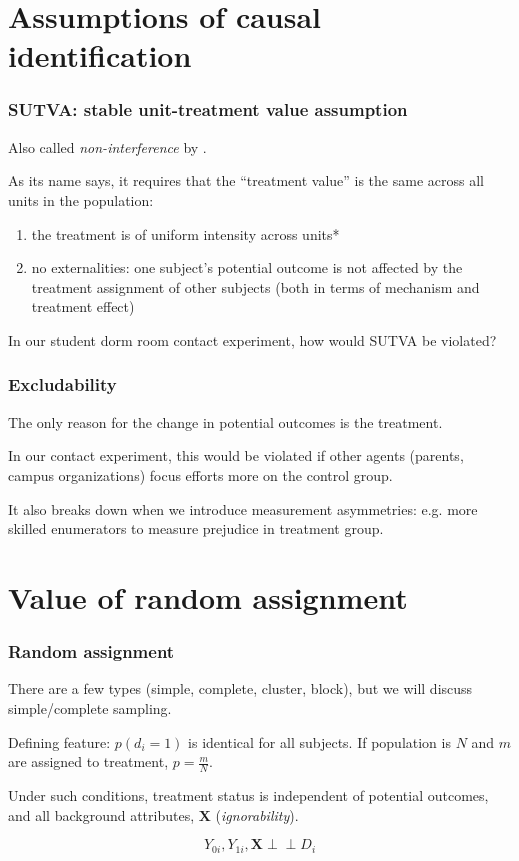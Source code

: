 \documentclass[12pt,english,dvipsnames,aspectratio=169,handout]{beamer}\usepackage[]{graphicx}\usepackage[]{xcolor}
\newcommand{\indep}{\perp \!\!\!\! \perp}
\begin{document}
\section{Assumptions of causal identification}

\begin{frame}
  \frametitle{SUTVA: stable unit-treatment value assumption}
  
  Also called \textit{non-interference} by .\bigskip
  
  As its name says, it requires that the ``treatment value'' is the same across all units in the population:
  
  \begin{enumerate}
    \item the treatment is of uniform intensity across units*
    \item no externalities: one subject's potential outcome is not affected by the treatment assignment of other subjects (both in terms of mechanism and treatment effect)
  \end{enumerate}\bigskip
  \pause
  
  In our student dorm room contact experiment, how would SUTVA be violated?
  
\end{frame}


\begin{frame}
  \frametitle{Excludability}
  
  The only reason for the change in potential outcomes is the treatment.\bigskip
  
  In our contact experiment, this would be violated if other agents (parents, campus organizations) focus efforts more on the control group.\bigskip
  \pause
  
  It also breaks down when we introduce measurement asymmetries: e.g. more skilled enumerators to measure prejudice in treatment group.
  
\end{frame}


\section{Value of random assignment}

\begin{frame}
  \frametitle{Random assignment}
  
  There are a few types (simple, complete, cluster, block), but we will discuss simple/complete sampling.\bigskip
  
  Defining feature: $p(d_i=1)$ is identical for all subjects. If population is $N$ and $m$ are assigned to treatment, $p = \frac{m}{N}$.\bigskip
  \pause
  
  Under such conditions, treatment status is independent of potential outcomes, and all background attributes, $\boldsymbol{X}$ (\textit{ignorability}).
  
  \begin{equation}
  Y_{0i}, Y_{1i}, \boldsymbol{X} \indep D_i
    \label{eq:16}
  \end{equation}
  
\end{frame}
\end{document}
